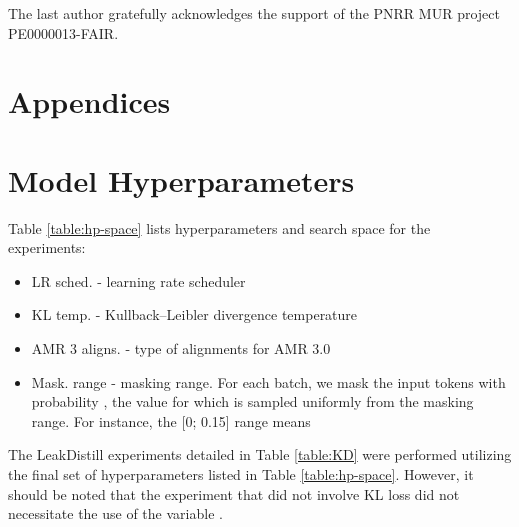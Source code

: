 \documentclass[11pt]{article}
\begin{document}
The last author gratefully acknowledges the support of the PNRR MUR project PE0000013-FAIR.




\appendix



\newpage


\newpage
\section*{Appendices}

\section{Model Hyperparameters}
Table \ref{table:hp-space} lists hyperparameters and search space for the experiments:
\begin{itemize}
\item LR sched. - learning rate scheduler
\item KL temp. - Kullback–Leibler divergence temperature 
\item AMR 3 aligns. - type of alignments for AMR 3.0
\item Mask. range - masking range. For each batch, we mask the input tokens with probability , the value for which is sampled uniformly from the masking range. For instance, the [0; 0.15] range means 
\end{itemize}

The LeakDistill experiments detailed in Table \ref{table:KD} were performed utilizing the final set of hyperparameters listed in Table \ref{table:hp-space}. However, it should be noted that the experiment that did not involve KL loss did not necessitate the use of the variable .
\end{document}
